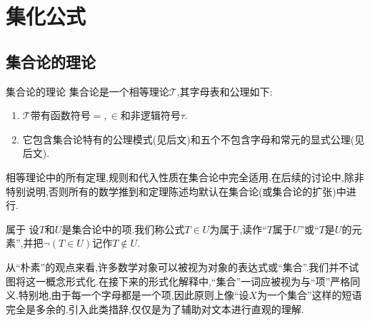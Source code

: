 \chapter{集化公式}

\section{集合论的理论}

\begin{definition}{集合论的理论}{}
	集合论是一个相等理论$\mathcal{T}$,其字母表和公理如下:
	\begin{enumerate}
		\item $\mathcal{T}$带有函数符号$=,\in$和非逻辑符号$\tau$.
		\item 它包含集合论特有的公理模式(见后文)和五个不包含字母和常元的显式公理(见后文).
	\end{enumerate}
\end{definition}

\begin{remark}{}{}
	相等理论中的所有定理,规则和代入性质在集合论中完全适用.在后续的讨论中,除非特别说明,否则所有的数学推到和定理陈述均默认在集合论(或集合论的扩张)中进行.
\end{remark}

\begin{definition}{属于}{}
	设$T$和$U$是集合论中的项.我们称公式$T\in U$为属于,读作``$T$属于$U$''或``$T$是$U$的元素'',并把$\neg\left(T\in U\right)$记作$T\notin U$.
\end{definition}

\begin{remark}{}{}
	从``朴素''的观点来看,许多数学对象可以被视为对象的表达式或``集合''.我们并不试图将这一概念形式化.在接下来的形式化解释中,``集合''一词应被视为与``项''严格同义.特别地,由于每一个字母都是一个项,因此原则上像``设$X$为一个集合''这样的短语完全是多余的.引入此类措辞,仅仅是为了辅助对文本进行直观的理解.
\end{remark}